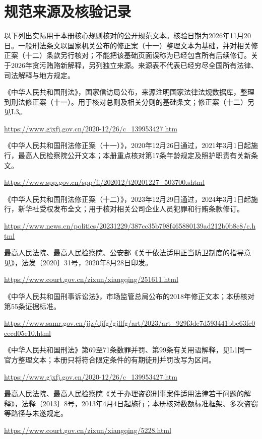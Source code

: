 \section{规范来源及核验记录}
以下列出实际用于本册核心规则核对的公开规范文本。核验日期为2026年11月20日。一般刑法条文以国家机关公布的修正案（十一）整理文本为基础，并对相关修正案（十二）条款另行核对；不能把该基础页面误称为已经包含所有后续修订。关于2026年贪污贿赂新解释，另列独立来源。来源表不代表已经穷尽全国所有法律、司法解释与地方规定。

\begingroup\small
\begin{description}[itemsep=4pt,parsep=0pt,topsep=4pt]
\item[\hypertarget{L1}{L1}] 《中华人民共和国刑法》，国家信访局公布，来源注明国家法律法规数据库，整理到刑法修正案（十一）。用于核对总则及相关分则的基础条文；修正案（十二）另见L3。\par\url{https://www.gjxfj.gov.cn/2020-12/26/c_139953427.htm}
\item[\hypertarget{L2}{L2}] 《中华人民共和国刑法修正案（十一）》，2020年12月26日通过，2021年3月1日起施行，最高人民检察院公开文本；本册重点核对第17条年龄规定及照护职责有关新条文。\par\url{https://www.spp.gov.cn/spp/fl/202012/t20201227_503700.shtml}
\item[\hypertarget{L3}{L3}] 《中华人民共和国刑法修正案（十二）》，2023年12月29日通过，2024年3月1日起施行，新华社受权发布全文；用于核对相关公司企业人员犯罪和行贿条款修订。\par\url{https://www.news.cn/politics/20231229/387cc35b798f465880139ad212b0b8c8/c.html}
\item[\hypertarget{L4}{L4}] 最高人民法院、最高人民检察院、公安部《关于依法适用正当防卫制度的指导意见》，法发〔2020〕31号，2020年8月28日印发。\par\url{https://www.court.gov.cn/zixun/xiangqing/251611.html}
\item[\hypertarget{L5}{L5}] 《中华人民共和国刑事诉讼法》，市场监管总局公布的2018年修正文本；本册核对第55条证据标准。\par\url{https://www.samr.gov.cn/jjz/djfg/gjflfg/art/2023/art_929f3de7d593441bbe63fe0eecd05e10.html}
\item[\hypertarget{L6}{L6}] 《中华人民共和国刑法》第69至71条数罪并罚、第99条有关用语解释，见L1同一官方整理文本；本册只将符合限定条件的有期徒刑并罚改写为区间。\par\url{https://www.gjxfj.gov.cn/2020-12/26/c_139953427.htm}
\item[\hypertarget{L7}{L7}] 最高人民法院、最高人民检察院《关于办理盗窃刑事案件适用法律若干问题的解释》，法释〔2013〕8号，2013年4月4日起施行；本册核对数额标准框架、多次盗窃等路径与未遂规定。\par\url{https://www.court.gov.cn/zixun/xiangqing/5228.html}

\end{description}
